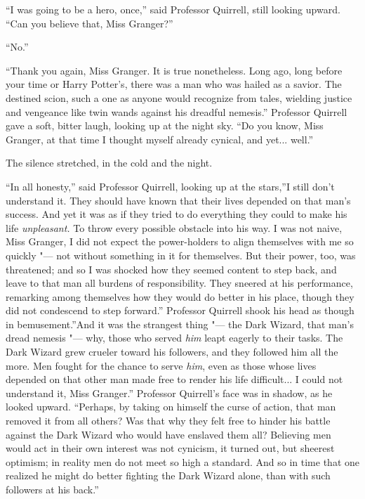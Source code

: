 ``I was going to be a hero, once,'' said Professor Quirrell, still
looking upward. ``Can you believe that, Miss Granger?''

``No.''

``Thank you again, Miss Granger. It is true nonetheless. Long ago, long
before your time or Harry Potter's, there was a man who was hailed as a
savior. The destined scion, such a one as anyone would recognize from
tales, wielding justice and vengeance like twin wands against his
dreadful nemesis.'' Professor Quirrell gave a soft, bitter laugh,
looking up at the night sky. ``Do you know, Miss Granger, at that time I
thought myself already cynical, and yet... well.''

The silence stretched, in the cold and the night.

``In all honesty,'' said Professor Quirrell, looking up at the stars,''I
still don't understand it. They should have known that their lives
depended on that man's success. And yet it was as if they tried to do
everything they could to make his life \emph{unpleasant.} To throw every
possible obstacle into his way. I was not naive, Miss Granger, I did not
expect the power-holders to align themselves with me so quickly "--- not
without something in it for themselves. But their power, too, was
threatened; and so I was shocked how they seemed content to step back,
and leave to that man all burdens of responsibility. They sneered at his
performance, remarking among themselves how they would do better in his
place, though they did not condescend to step forward.'' Professor
Quirrell shook his head as though in bemusement.''And it was the
strangest thing "--- the Dark Wizard, that man's dread nemesis "--- why, those
who served \emph{him} leapt eagerly to their tasks. The Dark Wizard grew
crueler toward his followers, and they followed him all the more. Men
fought for the chance to serve \emph{him}, even as those whose lives
depended on that other man made free to render his life
difficult... I could not understand it, Miss Granger.'' Professor
Quirrell's face was in shadow, as he looked upward. ``Perhaps, by taking
on himself the curse of action, that man removed it from all others? Was
that why they felt free to hinder his battle against the Dark Wizard who
would have enslaved them all? Believing men would act in their own
interest was not cynicism, it turned out, but sheerest optimism; in
reality men do not meet so high a standard. And so in time that one
realized he might do better fighting the Dark Wizard alone, than with
such followers at his back.''

